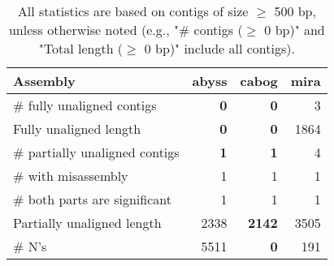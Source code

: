 \documentclass[12pt,a4paper]{article}
\begin{document}
\begin{table}[ht]
\begin{center}
\caption{All statistics are based on contigs of size $\geq$ 500 bp, unless otherwise noted (e.g., "\# contigs ($\geq$ 0 bp)" and "Total length ($\geq$ 0 bp)" include all contigs).}
\begin{tabular}{|l*{3}{|r}|}
\hline
Assembly & abyss & cabog & mira \\ \hline
\# fully unaligned contigs & {\bf 0} & {\bf 0} & 3 \\ \hline
Fully unaligned length & {\bf 0} & {\bf 0} & 1864 \\ \hline
\# partially unaligned contigs & {\bf 1} & {\bf 1} & 4 \\ \hline
\hspace{5mm}\# with misassembly & 1 & 1 & 1 \\ \hline
\hspace{5mm}\# both parts are significant & 1 & 1 & 1 \\ \hline
Partially unaligned length & 2338 & {\bf 2142} & 3505 \\ \hline
\# N's & 5511 & {\bf 0} & 191 \\ \hline
\end{tabular}
\end{center}
\end{table}
\end{document}
